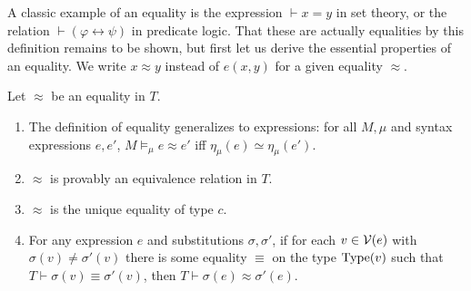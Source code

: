 \documentclass[runningheads,a4paper]{llncs}
\newcommand{\vph}{\varphi}
\newcommand{\type}{{\rm Type}}
\begin{document}
A classic example of an equality is the expression $\vdash x=y$ in set theory, or the relation $\vdash(\vph\leftrightarrow\psi)$ in predicate logic. That these are actually equalities by this definition remains to be shown, but first let us derive the essential properties of an equality. We write $x\approx y$ instead of $e(x,y)$ for a given equality $\approx$.

\begin{theorem}\label{thm:eq}
Let $\approx$ be an equality in $T$.
\begin{enumerate}
  \item The definition of equality generalizes to expressions: for all $M,\mu$ and syntax expressions $e,e'$, $M\models_\mu e\approx e'$ iff $\eta_\mu(e)\simeq\eta_\mu(e')$.
  \item $\approx$ is provably an equivalence relation in $T$.
  \item $\approx$ is the unique equality of type $c$.
  \item\label{thm:eq-subst} For any expression $e$ and substitutions $\sigma,\sigma'$, if for each $v\in{\cal V}(e)$ with $\sigma(v)\ne\sigma'(v)$ there is some equality $\equiv$ on the type $\type(v)$ such that $T\vdash\sigma(v)\equiv\sigma'(v)$, then $T\vdash \sigma(e)\approx\sigma'(e)$.
\end{enumerate}
\end{theorem}
\end{document}
